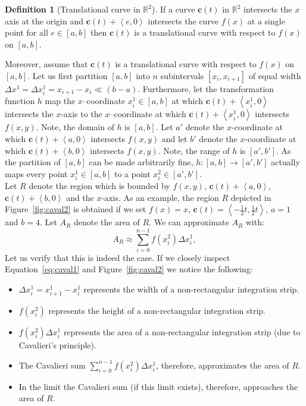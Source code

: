 \documentclass{article}
\theoremstyle{theorem}
\theoremstyle{definition}
\newtheorem*{definition}{Definition}
\begin{document}
\begin{definition}[Translational curve in $\mathbb{R}^2$]
If a curve $\mathbf{c}(t)$ in $\mathbb{R}^2$ intersects the $x$ axis at the origin and $\mathbf{c}(t) + \left < e,0 \right >$ intersects 
the curve $f(x)$ at a single point for all $e\in [a,b]$ then $\mathbf{c}(t)$ is a translational curve 
with respect to $f(x)$ on $[a,b]$. 
\end{definition}

\noindent
Moreover, assume that $\mathbf{c}(t)$ is a translational curve with respect to $f(x)$ on $[a,b]$. Let us first partition $[a,b]$ into $n$ subintervals $[x_{i},x_{i+1}]$ of equal 
width $\Delta x^1 = \Delta x_i^1 = x_{i+1}-x_i\ll (b-a)$. Furthermore, let the transformation function $h$ map the $x$--coordinate $x_i^1\in [a,b]$ at which $\mathbf{c}(t) + \left <x_i^1,0 \right >$ intersects the 
$x$-axis to the $x$--coordinate at which $\mathbf{c}(t) + \left <x_i^1,0 \right >$ intersects $f(x,y)$. Note, the domain of $h$ is $[a,b]$. Let $a'$ denote the $x$-coordinate 
at which $\mathbf{c}(t) + \left <a,0 \right >$ intersects $f(x,y)$ and let $b'$ denote the $x$-coordinate 
at which $\mathbf{c}(t) + \left <b,0 \right >$ intersects $f(x,y)$.  Note, the range 
of $h$ is $[a',b']$. As the partition of $[a,b]$ can be made arbitrarily fine, $h:[a,b]\rightarrow [a',b']$ actually maps every point $x_i^1\in [a,b]$ to a point $x_i^2\in [a',b']$. \\

\noindent
Let $R$ denote the region which is bounded by $f(x,y)$, $\mathbf{c}(t)+\left <a,0\right >$, $\mathbf{c}(t)+\left <b,0\right >$ and the $x$-axis. 
As an example, the region $R$ depicted in Figure~\ref{fig:caval2} is obtained if we set $f(x) = x$, $\mathbf{c}(t) = \left<-\frac{1}{2} t,\frac{1}{2} t\right>$, $a = 1$ and $b = 4$.
Let $A_R$ denote the area of $R$. We can approximate $A_R$ with:
\begin{equation}
 \label{eq:caval1}
 A_R \approx \sum_{i=0}^{n-1} f(x_i^2)\Delta x_i^1,
 \end{equation}
Let us verify that this is indeed the case. If we closely inspect Equation~\ref{eq:caval1} and Figure~\ref{fig:caval2} we notice the following:
 \begin{itemize}
  \item $\Delta x_i^1 = x_{i+1}^1 - x_i^1$ represents the width of a non-rectangular integration strip.
  \item $f(x_i^2)$ represents the height of a non-rectangular integration strip.
  \item $f(x_i^2)\Delta x_i^1$ represents the area of a non-rectangular integration strip (due to Cavalieri's principle).
  \item The Cavalieri sum $\sum_{i=0}^{n-1} f(x_i^2)\Delta x_i^1$, therefore, approximates the area of $R$.
  \item In the limit the Cavalieri sum (if this limit exists), therefore, approaches the area of $R$.
 \end{itemize}
\end{document}
